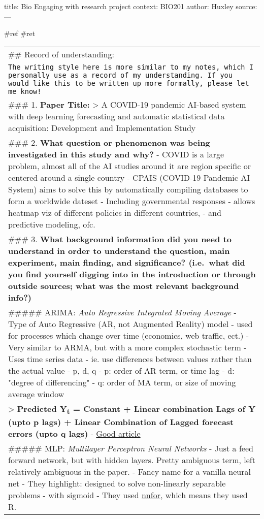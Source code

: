\documentclass[letterpaper]{article}
\date{\today}
\title{}
\renewcommand{\tableofcontents}{}
\begin{document}
\tableofcontents

title: Bio Engaging with research project context: BIO201 author: Huxley
source: ---

\#ref \#ret

\begin{center}
\begin{tabular}{l}
\#\# Record of understanding:\\
\texttt{The writing style here is more similar to my notes, which I personally use as a record of my understanding. If you would like this to be written up more formally, please let me know!}\\
\#\#\# 1. \textbf{Paper Title:} > A COVID-19 pandemic AI-based system with deep learning forecasting and automatic statistical data acquisition: Development and Implementation Study\\
\#\#\# 2. \textbf{What question or phenomenon was being investigated in this study and why?} - COVID is a large problem, almost all of the AI studies around it are region specific or centered around a single country - CPAIS (COVID-19 Pandemic AI System) aims to solve this by automatically compiling databases to form a worldwide dateset - Including governmental responses - allows heatmap viz of different policies in different countries, - and predictive modeling, ofc.\\
\#\#\# 3. \textbf{What background information did you need to understand in order to understand the question, main experiment, main finding, and significance? (i.e. what did you find yourself digging into in the introduction or through outside sources; what was the most relevant background info?)}\\
\#\#\#\#\# ARIMA: \emph{Auto Regressive Integrated Moving Average} - Type of Auto Regressive (AR, not Augmented Reality) model - used for processes which change over time (economics, web traffic, ect.) - Very similar to ARMA, but with a more complex stochastic term - Uses time series data - ie. use differences between values rather than the actual value - p, d, q - p: order of AR term, or time lag - d: "degree of differencing" - q: order of MA term, or size of moving average window\\
> \textbf{Predicted Y\textsubscript{t} = Constant + Linear combination Lags of Y (upto p lags) + Linear Combination of Lagged forecast errors (upto q lags)} - \href{https://www.machinelearningplus.com/time-series/arima-model-time-series-forecasting-python}{Good article}\\
\#\#\#\#\# MLP: \emph{Multilayer Perceptron Neural Networks} - Just a feed forward network, but with hidden layers. Pretty ambiguous term, left relatively ambiguous in the paper. - Fancy name for a vanilla neural net - They highlight: designed to solve non-linearly separable problems - with sigmoid - They used \href{https://github.com/trnnick/nnfor}{nnfor}, which means they used R.\\

\end{tabular}
\end{center}
\end{document}
